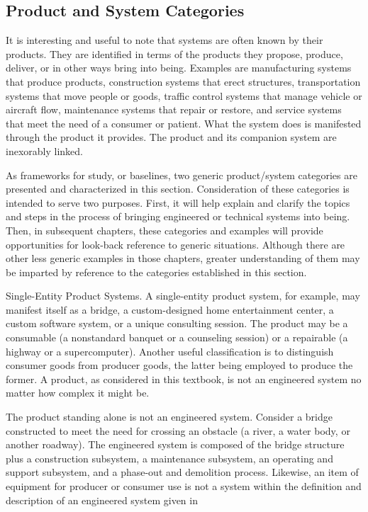 \subsection{Product and System Categories}

It is interesting and useful to note that systems are often known by their products. They are identified in terms of the products they propose, produce, deliver, or in other ways bring into being. Examples are manufacturing systems that produce products, construction systems that erect structures, transportation systems that move people or goods, traffic control systems that manage vehicle or aircraft flow, maintenance systems that repair or restore, and service systems that meet the need of a consumer or patient. What the system does is manifested through the product it provides. The product and its companion system are inexorably linked.

As frameworks for study, or baselines, two generic product/system categories are presented and characterized in this section. Consideration of these categories is intended to serve two purposes. First, it will help explain and clarify the topics and steps in the process of bringing engineered or technical systems into being. Then, in subsequent chapters, these categories and examples will provide opportunities for look-back reference to generic situations. Although there are other less generic examples in those chapters, greater understanding of them may be imparted by reference to the categories established in this section.

Single-Entity Product Systems. A single-entity product system, for example, may manifest itself as a bridge, a custom-designed home entertainment center, a custom software system, or a unique consulting session. The product may be a consumable (a nonstandard banquet or a counseling session) or a repairable (a highway or a supercomputer). Another useful classification is to distinguish consumer goods from producer goods, the latter being employed to produce the former. A product, as considered in this textbook, is not an engineered system no matter how complex it might be.

The product standing alone is not an engineered system. Consider a bridge constructed to meet the need for crossing an obstacle (a river, a water body, or another roadway). The engineered system is composed of the bridge structure plus a construction subsystem, a maintenance subsystem, an operating and support subsystem, and a phase-out and demolition process. Likewise, an item of equipment for producer or consumer use is not a system within the definition and description of an engineered system given in 

